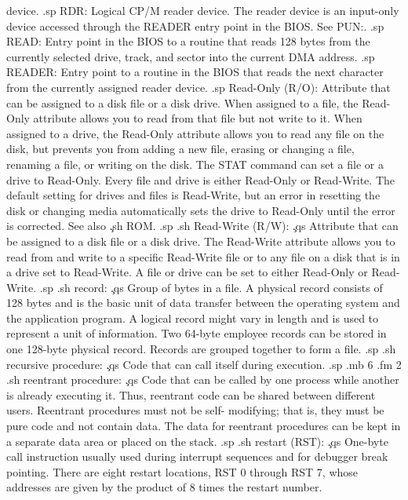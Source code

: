 device.
.sp
RDR: 
Logical CP/M reader device.  The reader device is an input-only 
device accessed through the READER entry point in the BIOS.  
See 
PUN:.
.sp
READ: 
Entry point in the BIOS to a routine that reads 128 bytes from 
the currently selected drive, track, and sector into the current 
DMA address.
.sp
READER: 
Entry point to a routine in the BIOS that reads the next 
character from the currently assigned reader device.
.sp
Read-Only (R/O): 
Attribute that can be assigned to a disk file or a disk drive.  
When assigned to a file, the Read-Only attribute allows you to 
read from that file but not write to it.  When assigned to a 
drive, the Read-Only attribute allows you to read any file on the 
disk, but prevents you from adding a new file, erasing or changing 
a file, renaming a file, or writing on the disk.  The STAT 
command can set a file or a drive to Read-Only.  Every file and 
drive is either Read-Only or Read-Write.  The default setting for 
drives and files is Read-Write, but an error in resetting the 
disk or changing media automatically sets the drive to Read-Only 
until the error is corrected.  See also \c
.sh
ROM.
.sp
.sh
Read-Write (R/W):  \c
.qs
Attribute that can be assigned to a disk file or a disk drive.  
The Read-Write attribute allows you to read from and write to a 
specific Read-Write file or to any file on a disk that is in a 
drive set to Read-Write.  A file or drive can be set to either 
Read-Only or Read-Write.
.sp
.sh
record:  \c
.qs
Group of bytes in a file.  A physical record consists of 128 
bytes and is the basic unit of data transfer between the 
operating system and the application program.  A logical record 
might vary in length and is used to represent a unit of 
information.  Two 64-byte employee records can be stored in one 
128-byte physical record.  Records are grouped together to form a 
file.
.sp
.sh
recursive procedure:  \c
.qs
Code that can call itself during execution.
.sp
.mb 6
.fm 2
.sh
reentrant procedure:  \c
.qs
Code that can be called by one process while another is already 
executing it.  Thus, reentrant code can be shared between 
different users.  Reentrant procedures must not be self-
modifying; that is, they must be pure code and not contain data.  
The data for reentrant procedures can be kept in a separate data 
area or placed on the stack.
.sp
.sh
restart (RST):  \c
.qs
One-byte call instruction usually used during interrupt sequences 
and for debugger break pointing.  There are eight restart 
locations, RST 0 through RST 7, whose addresses are given by the 
product of 8 times the restart number.
